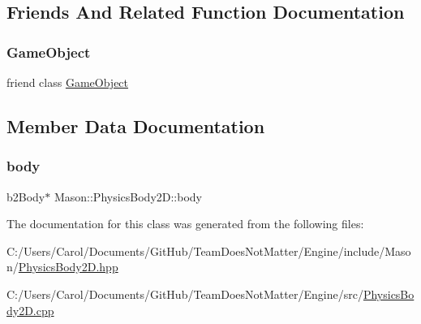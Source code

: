 \subsection{Friends And Related Function Documentation}
\hypertarget{class_mason_1_1_physics_body2_d_a00df87c957d8f7ee0fc51f07a0542f4a}{}\label{class_mason_1_1_physics_body2_d_a00df87c957d8f7ee0fc51f07a0542f4a} 
\subsubsection{\texorpdfstring{Game\+Object}{GameObject}}
{\footnotesize\ttfamily friend class \hyperlink{class_mason_1_1_game_object}{Game\+Object}\hspace{0.3cm}{\ttfamily [friend]}}



\subsection{Member Data Documentation}
\hypertarget{class_mason_1_1_physics_body2_d_abd02e269a86d5b760966a33eefa918d9}{}\label{class_mason_1_1_physics_body2_d_abd02e269a86d5b760966a33eefa918d9} 
\subsubsection{\texorpdfstring{body}{body}}
{\footnotesize\ttfamily b2\+Body$\ast$ Mason\+::\+Physics\+Body2\+D\+::body}



The documentation for this class was generated from the following files\+:\begin{DoxyCompactItemize}
\item 
C\+:/\+Users/\+Carol/\+Documents/\+Git\+Hub/\+Team\+Does\+Not\+Matter/\+Engine/include/\+Mason/\hyperlink{_physics_body2_d_8hpp}{Physics\+Body2\+D.\+hpp}\item 
C\+:/\+Users/\+Carol/\+Documents/\+Git\+Hub/\+Team\+Does\+Not\+Matter/\+Engine/src/\hyperlink{_physics_body2_d_8cpp}{Physics\+Body2\+D.\+cpp}\end{DoxyCompactItemize}
